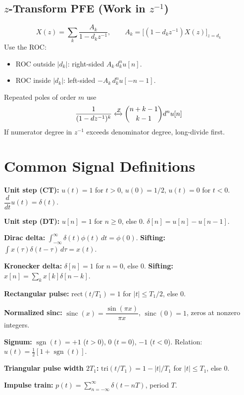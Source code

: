 \documentclass[10pt]{article}
\newcommand{\sinc}{\operatorname{sinc}}
\newcommand{\sgn}{\operatorname{sgn}}
\newcommand{\ztrans}{\xleftrightarrow{\mathcal{Z}}}
\begin{document}
\subsection{$z$-Transform PFE (Work in $z^{-1}$)}
\[
X(z) = \sum_k \frac{A_k}{1 - d_k z^{-1}},\qquad
A_k = \bigl[(1 - d_k z^{-1})X(z)\bigr]_{z = d_k}
\]
Use the ROC:
\begin{itemize}\setlength\itemsep{-2pt}
\item ROC outside $|d_k|$: right-sided $A_k\,d_k^n u[n]$.
\item ROC inside $|d_k|$: left-sided $-A_k\,d_k^n u[-n-1]$.
\end{itemize}
Repeated poles of order $m$ use
\[
\frac{1}{(1 - dz^{-1})^k}\ztrans \binom{n + k - 1}{k - 1}d^n u[n]
\]
If numerator degree in $z^{-1}$ exceeds denominator degree, long-divide first.

\section{Common Signal Definitions}

\textbf{Unit step (CT):} $u(t) = 1$ for $t > 0$, $u(0) = 1/2$, $u(t) = 0$ for $t < 0$. $\dfrac{d}{dt}u(t) = \delta(t)$.

\textbf{Unit step (DT):} $u[n] = 1$ for $n \ge 0$, else $0$. $\delta[n] = u[n] - u[n-1]$.

\textbf{Dirac delta:} $\int_{-\infty}^{\infty}\delta(t)\phi(t)\,dt = \phi(0)$. \textbf{Sifting:} $\int x(\tau)\delta(t-\tau)\,d\tau = x(t)$.

\textbf{Kronecker delta:} $\delta[n] = 1$ for $n = 0$, else $0$. \textbf{Sifting:} $x[n] = \sum_k x[k]\delta[n - k]$.

\textbf{Rectangular pulse:} $\mathrm{rect}(t/T_1) = 1$ for $|t| \le T_1/2$, else $0$.

\textbf{Normalized sinc:} $\sinc(x) = \dfrac{\sin(\pi x)}{\pi x}$, $\sinc(0) = 1$, zeros at nonzero integers.

\textbf{Signum:} $\sgn(t) = +1$ ($t > 0$), $0$ ($t = 0$), $-1$ ($t < 0$). Relation: $u(t) = \tfrac{1}{2}[1 + \sgn(t)]$.

\textbf{Triangular pulse width $2T_1$:} $\mathrm{tri}(t/T_1) = 1 - |t|/T_1$ for $|t| \le T_1$, else $0$.

\textbf{Impulse train:} $p(t) = \sum_{n=-\infty}^{\infty}\delta(t - nT)$, period $T$.
\end{document}
